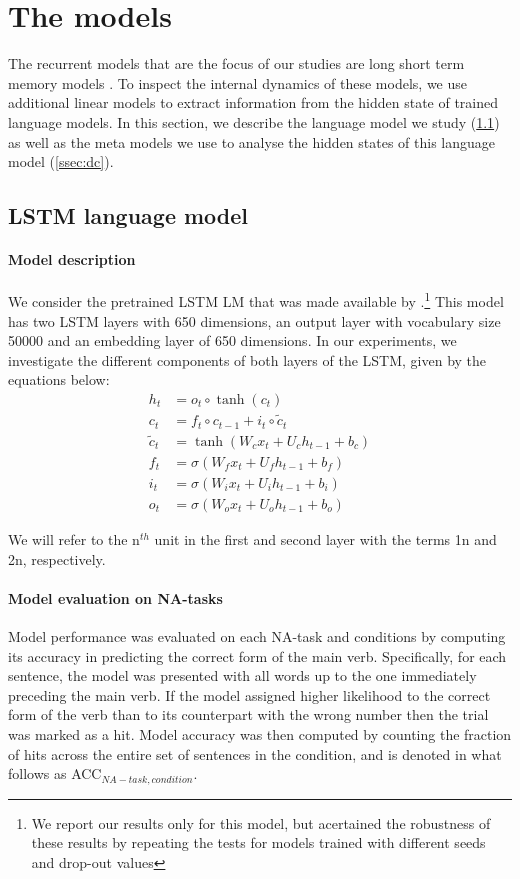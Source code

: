 
\section{The models}

The recurrent models that are the focus of our studies are long short term memory models \cite[LSTMs]{Hochreiter:Schmidhuber:1997}.
To inspect the internal dynamics of these models, we use additional linear models to extract information from the hidden state of trained language models.
In this section, we describe the language model we study (\ref{ssec:lstm_lm}) as well as the meta models we use to analyse the hidden states of this language model (\ref{ssec:dc}).

\subsection{LSTM language model}\label{ssec:lstm_lm}

\paragraph{Model description} We consider the pretrained LSTM LM that was made available by \cite{Gulordava:etal:2018}.\footnote{We report our results only for this model, but acertained the robustness of these results by repeating the tests for models trained with different seeds and drop-out values}
This model has two LSTM layers with 650 dimensions, an output layer with vocabulary size 50000 and an embedding layer of 650 dimensions.
In our experiments, we investigate the different components of both layers of the LSTM, given by the equations below:
\begin{align}
    h_t & = o_t\circ \tanh(c_t)\\ 
     c_t & = f_t\circ c_{t-1} + i_t\circ \widetilde{c}_t\\
     \widetilde{c}_t & = \tanh(W_cx_t + U_ch_{t-1} + b_c)\\
     f_t & = \sigma(W_fx_t + U_fh_{t-1} + b_f) \\
     i_t & = \sigma(W_ix_t + U_ih_{t-1} + b_i) \\
     o_t & = \sigma(W_ox_t + U_oh_{t-1} + b_o)
\end{align}

We will refer to the n$^{th}$ unit in the first and second layer with the terms \unit{1}{n} and \unit{2}{n}, respectively.

\paragraph{Model evaluation on NA-tasks}
Model performance was evaluated on each NA-task and conditions by computing its accuracy in predicting the correct form of the main verb. Specifically, for each sentence, the model was presented with all words up to the one immediately preceding the main verb. If the model assigned higher likelihood to the correct form of the verb than to its counterpart with the wrong number then the trial was marked as a hit. Model accuracy was then computed by counting the fraction of hits across the entire set of sentences in the condition, and is denoted in what follows as ACC$_{NA-task, condition}$.


